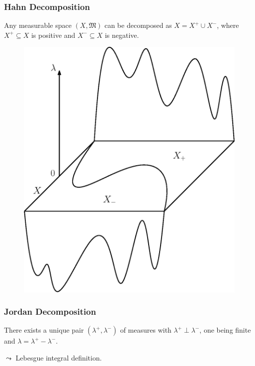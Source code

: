 \documentclass[10pt, hyperref={hidelinks}]{beamer}
\begin{document}
    \begin{frame}
        \frametitle{Hahn Decomposition}

        \begin{theorem} \label{thm:hahn_decomposition}
            Any measurable space \((X, \mathfrak{M})\) can be decomposed as \(X = X^+ \cup X^-\), where \(X^+ \subseteq X\) is positive and \(X^- \subseteq X\) is negative.
        \end{theorem}

        \pause

        \begin{figure}[!hbtp]
            \centering
            \includegraphics[width=0.4\linewidth]{../notes/img/hahn.eps}
        \end{figure}
    \end{frame}

    \begin{frame}
        \frametitle{Jordan Decomposition}

        \begin{theorem} \label{thm:jordan_decomposition}
            There exists a unique pair \((\lambda^+, \lambda^-)\) of measures with \(\lambda^+ \perp \lambda^-\), one being finite and \(\lambda = \lambda^+ - \lambda^-\).
        \end{theorem}

        \pause

        \(\leadsto\) Lebesgue integral definition.
    \end{frame}
\end{document}
